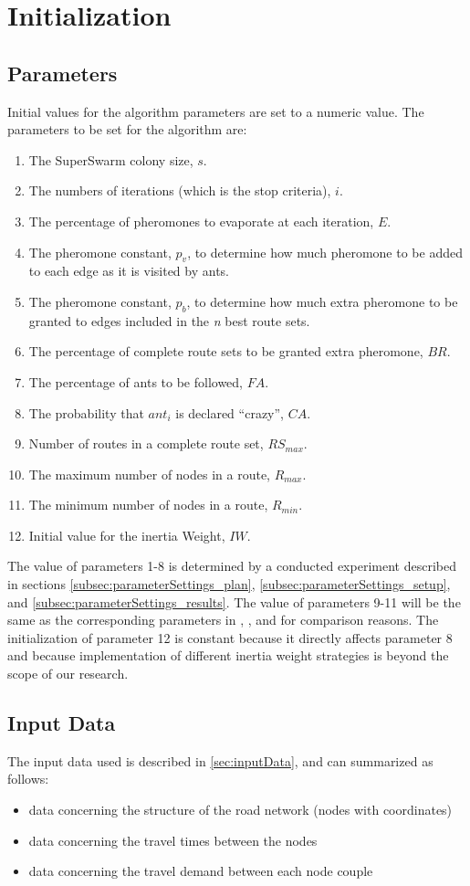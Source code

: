 \section{Initialization}
\label{sec:algoInitialization}
\subsection{Parameters}
Initial values for the algorithm parameters are set to a numeric value. The parameters to be set for the algorithm are:
\begin{enumerate}
\item The SuperSwarm colony size, $s$. 
\item The numbers of iterations (which is the stop criteria), $i$.
\item The percentage of pheromones to evaporate at each iteration, $E$.
\item The pheromone constant, $p_v$, to determine how much pheromone to be added to each edge as it is visited by ants.
\item The pheromone constant, $p_b$, to determine how much extra pheromone to be granted to edges included in the \textit{n} best route sets.
\item The percentage of complete route sets to be granted extra pheromone, $BR$.
\item The percentage of ants to be followed, $FA$.
\item The probability that $ant_i$ is declared ``crazy'', $CA$.
\item Number of routes in a complete route set, $RS_{max}$. 
\item The maximum number of nodes in a route, $R_{max}$.
\item The minimum number of nodes in a route, $R_{min}$.
\item Initial value for the inertia Weight, $IW$.
\end{enumerate}
The value of parameters 1-8 is determined by a conducted experiment described in sections \vref{subsec:parameterSettings_plan}, \vref{subsec:parameterSettings_setup}, and \vref{subsec:parameterSettings_results}. The value of parameters 9-11 will be the same as the corresponding parameters in \citet{mandl79}, \citet{kechagiopoulos14}, and \citet{nikolic14} for comparison reasons. The initialization of parameter 12 is constant because it directly affects parameter 8 and because implementation of different inertia weight strategies is beyond the scope of our research.   

\subsection{Input Data}
The input data used is described in \vref{sec:inputData}, and can summarized as follows:
\begin{itemize}
\item data concerning the structure of the road network (nodes with coordinates)
\item data concerning the travel times between the nodes 
\item data concerning the travel demand between each node couple
\end{itemize}

